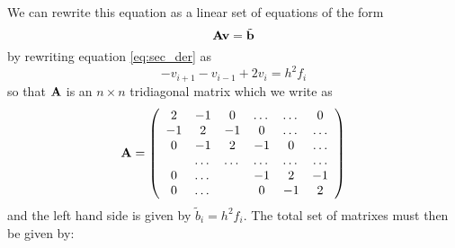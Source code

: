 \documentclass[11pt,a4wide]{article}
\begin{document}
We can rewrite this equation as a linear set of equations of the form 
\begin{equation}
   {\bf A}{\bf v} = \tilde{{\bf b}}
   \label{eq:linear_eq}
\end{equation}
by rewriting equation \ref{eq:sec_der} as
\[  
   -v_{i+1}-v_{i-1}+2v_i = h^2f_i
\]
so that ${\bf A}$ is an $n\times n$  tridiagonal matrix which we write as 
\begin{equation}
    {\bf A} = \left(\begin{array}{cccccc}
                           2& -1& 0 &\dots   & \dots &0 \\
                           -1 & 2 & -1 &0 &\dots &\dots \\
                           0&-1 &2 & -1 & 0 & \dots \\
                           & \dots   & \dots &\dots   &\dots & \dots \\
                           0&\dots   &  &-1 &2& -1 \\
                           0&\dots    &  & 0  &-1 & 2 \\
                      \end{array} \right)
\end{equation}
and the left hand side is given by $\tilde{b}_i=h^2f_i$. The total set of matrixes must then be given by:
\end{document}
